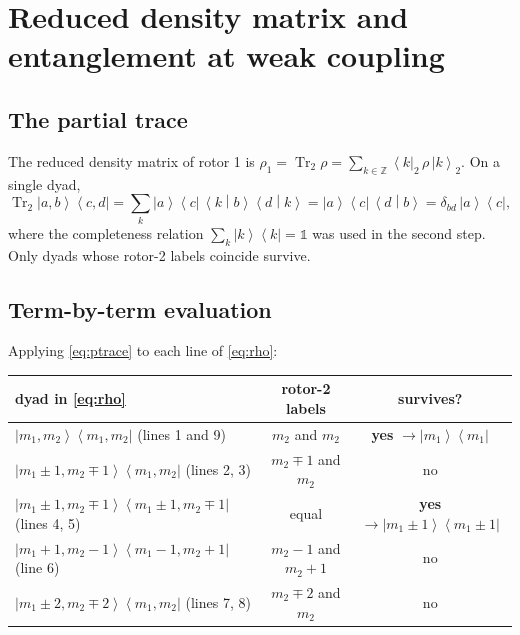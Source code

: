 \documentclass[preprint,12pt]{elsarticle}
\newcommand{\Tr}{\operatorname{Tr}}
\newcommand{\ket}[1]{\left|#1\right\rangle}
\newcommand{\bra}[1]{\left\langle#1\right|}
\newcommand{\braket}[2]{\left\langle#1\middle|#2\right\rangle}
\newcommand{\ketbra}[2]{\left|#1\right\rangle\!\left\langle#2\right|}
\begin{document}
\section{Reduced density matrix and entanglement at weak coupling}
\label{sec:S}

\subsection{The partial trace}

The reduced density matrix of rotor 1 is
$\rho_{1}=\Tr_{2}\rho=\sum_{k\in\mathbb{Z}}\bra{k}_{2}\,\rho\,\ket{k}_{2}$. On a
single dyad,
\begin{equation}
\Tr_{2}\ketbra{a,b}{c,d}
=\sum_{k}\ket{a}\bra{c}\,\braket{k}{b}\braket{d}{k}
=\ket{a}\bra{c}\,\braket{d}{b}
=\delta_{bd}\,\ketbra ac ,
\label{eq:ptrace}
\end{equation}
where the completeness relation $\sum_{k}\ket k\bra k=\mathbb{1}$ was used in
the second step. Only dyads whose rotor-2 labels coincide survive.

\subsection{Term-by-term evaluation}

Applying \eqref{eq:ptrace} to each line of \eqref{eq:rho}:

\begin{center}\small
\renewcommand{\arraystretch}{1.3}
\begin{tabular}{lcc}
\toprule
dyad in \eqref{eq:rho} & rotor-2 labels & survives?\\
\midrule
$\ketbra{m_{1},m_{2}}{m_{1},m_{2}}$ (lines 1 and 9)
& $m_{2}$ and $m_{2}$ & \textbf{yes} $\to\ketbra{m_{1}}{m_{1}}$\\
$\ketbra{m_{1}\pm1,m_{2}\mp1}{m_{1},m_{2}}$ (lines 2, 3)
& $m_{2}\mp1$ and $m_{2}$ & no\\
$\ketbra{m_{1}\pm1,m_{2}\mp1}{m_{1}\pm1,m_{2}\mp1}$ (lines 4, 5)
& equal & \textbf{yes} $\to\ketbra{m_{1}\pm1}{m_{1}\pm1}$\\
$\ketbra{m_{1}+1,m_{2}-1}{m_{1}-1,m_{2}+1}$ (line 6)
& $m_{2}-1$ and $m_{2}+1$ & no\\
$\ketbra{m_{1}\pm2,m_{2}\mp2}{m_{1},m_{2}}$ (lines 7, 8)
& $m_{2}\mp2$ and $m_{2}$ & no\\
\bottomrule
\end{tabular}
\end{center}
\end{document}
